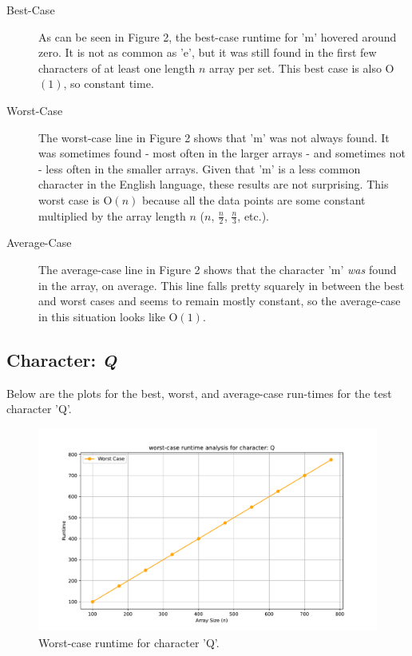 \documentclass{article}
\begin{document}
\begin{description}
    \item[Best-Case] As can be seen in Figure 2, the best-case runtime for 'm' hovered around zero. It is not as common as 'e', but it was still found in the first few characters of at least one length $n$ array per set. This best case is also O$(1)$, so constant time.
    \item[Worst-Case] The worst-case line in Figure 2 shows that 'm' was not always found. It was sometimes found - most often in the larger arrays - and sometimes not - less often in the smaller arrays. Given that 'm' is a less common character in the English language, these results are not surprising. This worst case is O$(n)$ because all the data points are some constant multiplied by the array length $n$ ($n$, $\frac{n}{2}$, $\frac{n}{3}$, etc.).
    \item[Average-Case] The average-case line in Figure 2 shows that the character 'm' \textit{was} found in the array, on average. This line falls pretty squarely in between the best and worst cases and seems to remain mostly constant, so the average-case in this situation looks like O$(1)$. 
\end{description}

\subsection{Character: \textit{Q}}
Below are the plots for the best, worst, and average-case run-times for the test character 'Q'.
	
	\begin{figure}[H]
		\centering
		\includegraphics[width=\textwidth]{runtime_analysis_worst_Q.pdf}
		\caption{Worst-case runtime for character 'Q'.}
	\end{figure}
\end{document}
